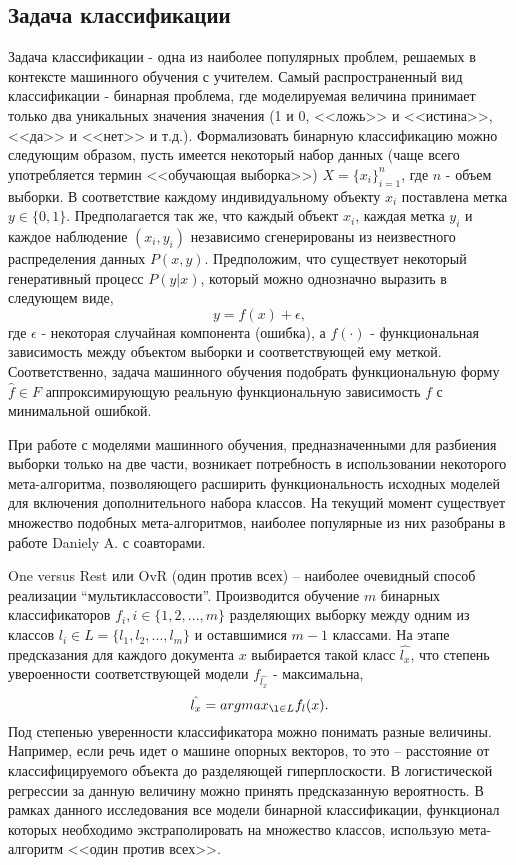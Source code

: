 \documentclass[runningheads]{llncs}
\begin{document}
\subsection{Задача классификации}
Задача классификации - одна из наиболее популярных проблем, решаемых в контексте машинного обучения с учителем. Самый распространенный вид классификации - бинарная проблема, где моделируемая величина принимает только два уникальных значения значения (1 и 0, <<ложь>> и <<истина>>, <<да>> и <<нет>> и т.д.). Формализовать бинарную классификацию можно следующим образом, пусть имеется некоторый набор данных (чаще всего употребляется термин <<обучающая выборка>>) $X = \{x_i\}_{i=1}^n$, где $n$ - объем выборки. В соответствие каждому индивидуальному объекту $x_i$ поставлена метка $y \in \{0, 1\}$. Предполагается так же, что каждый объект $x_i$, каждая метка $y_i$ и каждое наблюдение $(x_i, y_i)$ независимо сгенерированы из неизвестного распределения данных $P(x, y)$. Предположим, что существует некоторый генеративный процесс $P(y | x)$, который можно однозначно выразить в следующем виде,
$$y = f(x) + \epsilon,$$
где $\epsilon$ - некоторая случайная компонента (ошибка), а $f(\cdot)$ - функциональная зависимость между объектом выборки и соответствующей ему меткой. Соответственно, задача машинного обучения подобрать функциональную форму $\hat{f} \in F$ аппроксимирующую реальную функциональную зависимость $f$ с минимальной ошибкой. \par
При работе с моделями машинного обучения, предназначенными для разбиения выборки только на две части, возникает потребность в использовании некоторого мета-алгоритма, позволяющего расширить функциональность исходных моделей для включения дополнительного набора классов. На текущий момент существует множество подобных мета-алгоритмов, наиболее популярные из них разобраны в работе Daniely A. \cite{multiclass} с соавторами. \par
One versus Rest или OvR (один против всех) – наиболее очевидный способ реализации “мультиклассовости”. Производится обучение $m$ бинарных классификаторов $f_i, i \in \{1, 2, ..., m\}$ разделяющих выборку между одним из классов $l_i \in L= \{l_1, l_2, ..., l_m\}$ и оставшимися $m - 1$ классами. На этапе предсказания для каждого документа $x$ выбирается такой класс $\hat{l_x}$, что степень увероенности соответствующей модели $f_{\hat{l_x}}$ - максимальна,
$$\hat{l_x} = arg max_{\l \in L} f_l(x).$$
Под степенью уверенности классификатора можно понимать разные величины. Например, если речь идет о машине опорных векторов, то это – расстояние от классифицируемого объекта до разделяющей гиперплоскости. В логистической регрессии за данную величину можно принять предсказанную вероятность. В рамках данного исследования все модели бинарной классификации, функционал которых необходимо экстраполировать на множество классов, использую мета-алгоритм <<один против всех>>. \par
\end{document}
